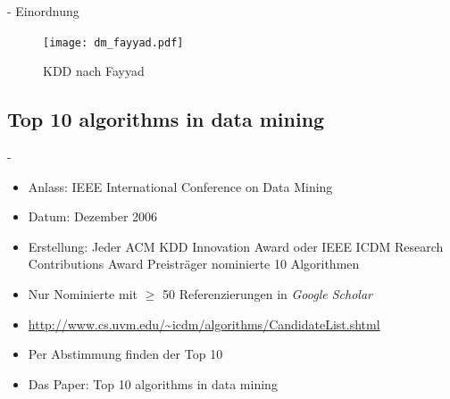 \documentclass[fleqn,11pt,aspectratio=43]{beamer}
\begin{document}
\begin{frame}{\insertsectionhead - Einordnung}
\begin{figure}
\texttt{[image: dm\_fayyad.pdf]}
\caption{KDD nach Fayyad \cite{fayyad1996data}}
\label{fig:fayyad1996data}
\end{figure}
\end{frame}

%


\subsection{Top 10 algorithms in data mining~}
\begin{frame}{\insertsectionhead - \insertsubsectionhead \cite{wu2008top}}
\begin{itemize}
\item Anlass: IEEE International Conference on Data Mining
\item Datum: Dezember 2006
\item Erstellung: Jeder ACM KDD Innovation Award oder IEEE ICDM Research 
Contributions Award Preisträger nominierte 10 Algorithmen
\item Nur Nominierte mit $\geq$ 50 Referenzierungen in \emph{Google Scholar}
\item 
{\small\url{http://www.cs.uvm.edu/~icdm/algorithms/CandidateList.shtml}}
\item Per Abstimmung finden der Top 10
\item Das Paper: Top 10 algorithms in data mining  \cite{wu2008top}
\end{itemize}
\end{frame}
\end{document}
